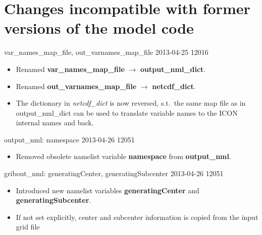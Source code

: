 \section{Changes incompatible with former versions of the model code}\label{sec:changes}
\noindent
%

\begin{changeitem}{ var\_names\_map\_file, out\_varnames\_map\_file }{ 2013-04-25 }{ 12016 }
  \begin{itemize}
   \item Renamed \textbf{var\_names\_map\_file} $\rightarrow$ \textbf{output\_nml\_dict}.
   \item Renamed \textbf{out\_varnames\_map\_file} $\rightarrow$ \textbf{netcdf\_dict}.
   \item The dictionary in \emph{netcdf\_dict} is now reversed, s.t.\ the same map file
         as in output\_nml\_dict can be used to translate variable names to the ICON internal
         names and back.
  \end{itemize}
\end{changeitem}


\begin{changeitem}{output\_nml: namespace}{ 2013-04-26 }{ 12051 }
  \begin{itemize}
   \item Removed obsolete namelist variable \textbf{namespace} from \textbf{output\_nml}.
  \end{itemize}
\end{changeitem}

\begin{changeitem}{gribout\_nml: generatingCenter, generatingSubcenter}{ 2013-04-26 }{ 12051 }
  \begin{itemize}
   \item Introduced new namelist variables \textbf{generatingCenter} and \textbf{generatingSubcenter}.
   \item If not set explicitly, center and subcenter information is copied from the input grid file
  \end{itemize}
\end{changeitem}

